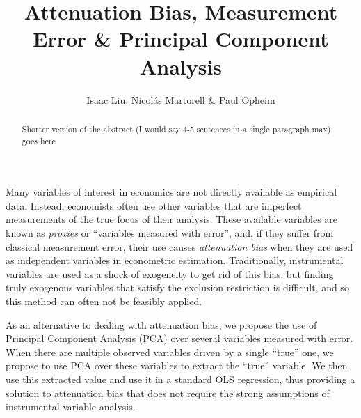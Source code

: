 \documentclass[12pt]{article}
\begin{document}
    \thispagestyle{firststyle}

    \author{Isaac Liu, Nicol\'as Martorell \& Paul Opheim}
    \title{Attenuation Bias, Measurement Error \& Principal Component Analysis} 
    \maketitle



    \begin{abstract}

        Shorter version of the abstract (I would say 4-5 sentences in a single paragraph max) goes here
        
    \end{abstract}

    \newpage \clearpage

        Many variables of interest in economics are not directly available as empirical data. Instead, economists often use other variables that are imperfect measurements of the true focus of their analysis. These available variables are known as \textit{proxies} or ``variables measured with error'', and, if they suffer from classical measurement error, their use causes \textit{attenuation bias} when they are used as independent variables in econometric estimation. Traditionally, instrumental variables are used as a shock of exogeneity to get rid of this bias, but finding truly exogenous variables that satisfy the exclusion restriction is difficult, and so this method can often not be feasibly applied.

        As an alternative to dealing with attenuation bias, we propose the use of Principal Component Analysis (PCA) over several variables measured with error. When there are multiple observed variables driven by a single ``true'' one, we propose to use PCA over these variables to extract the ``true'' variable. We then use this extracted value and use it in a standard OLS regression, thus providing a solution to attenuation bias that does not require the strong assumptions of instrumental variable analysis.
\end{document}
